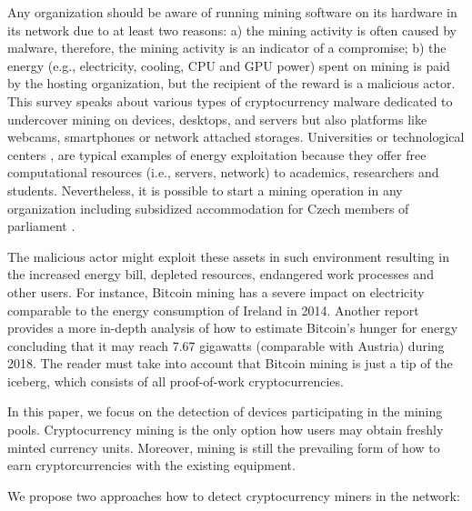 \documentclass[preprint,12pt,3p]{elsarticle}
\begin{document}
Any organization should be aware of running mining software on its hardware in its network due to at least two reasons: a) the mining activity is often caused by malware, therefore, the mining activity is an indicator of a compromise; b) the energy (e.g., electricity, cooling, CPU and GPU power) spent on mining is paid by the hosting organization, but the recipient of the reward is a malicious actor. This survey \cite{ali2015bitcoin} speaks about various types of cryptocurrency malware dedicated to undercover mining on devices, desktops, and servers but also platforms like webcams, smartphones or network attached storages. Universities \cite{THEGUARDIAN-STUDENT} or technological centers \cite{CCN-STUDENT}, \cite{INDEPENDENT-BANSCIENTIST} are typical examples of energy exploitation because they offer free computational resources (i.e., servers, network) to academics, researchers and students. Nevertheless, it is possible to start a mining operation in any organization including subsidized accommodation for Czech members of parliament \cite{AKTUALNE-PIRAT}.  

The malicious actor might exploit these assets in such environment resulting in the increased energy bill, depleted resources, endangered work processes and other users. For instance, Bitcoin mining has a severe impact on electricity comparable to the energy consumption of Ireland \cite{ENERGY14} in 2014. Another report \cite{de2018bitcoin} provides a more in-depth analysis of how to estimate Bitcoin's hunger for energy concluding that it may reach 7.67 gigawatts (comparable with Austria) during 2018. The reader must take into account that Bitcoin mining is just a tip of the iceberg, which consists of all proof-of-work cryptocurrencies.

In this paper, we focus on the detection of devices participating in the mining pools. Cryptocurrency mining is the only option how users may obtain freshly minted currency units. Moreover, mining is still the prevailing form of how to earn cryptorcurrencies with the existing equipment.

We propose two approaches how to detect cryptocurrency miners in the network:
\end{document}
